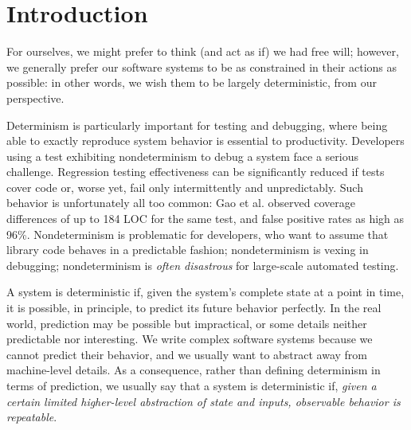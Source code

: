 \section{Introduction}

For ourselves, we might prefer to think (and act as if) we had free
will; however, we generally prefer our software systems to be as
constrained in their actions as possible:  in other words, we wish
them to be largely deterministic, from our perspective.

Determinism is particularly important for testing and debugging, where
being able to exactly reproduce system behavior is essential to
productivity.  Developers using a test exhibiting nondeterminism
to debug a system
face a serious challenge.
Regression testing
effectiveness can be significantly reduced if tests cover code or,
worse yet, fail only
intermittently and unpredictably.  Such behavior is
unfortunately all too common:  Gao et
al. \cite{Gao:2015:MSU:2818754.2818764} observed coverage differences
of up to 184 LOC for the same test, and false positive rates
as high as 96\%.  Nondeterminism is problematic for
developers, who want to  assume that library code behaves in a  predictable fashion; nondeterminism is
vexing in debugging; nondeterminism is \emph{often disastrous} for large-scale 
automated testing.



A system is deterministic if, given the system's complete state at a point in
time, it is possible, in principle, to predict its future behavior
perfectly.  In the real world,
prediction may be possible but  impractical, or some details neither
predictable nor interesting.  We write
complex software systems because we cannot predict their
behavior, and we usually want to abstract away from machine-level details.  As a consequence, rather than
defining determinism in terms of prediction, we usually 
say that a system is deterministic if, \emph{given a certain limited
  higher-level abstraction of state
and inputs, observable behavior is repeatable}.  %

\begin{comment}
Because the
programmer's abstraction of the system ignores a large number of
details, very few tests are ``deterministic'' in the sense
that they eliminate all changes between executions.  Running the same test
twice almost always results in differences, given a low enough level of
abstraction, since the system load,
cache contents, branch predictor history, etc. are almost never
controlled for; however, what matters is when
some kind of nondeterminism unexpectedly impacts computed values at a
higher level of abstraction.
\end{comment}

